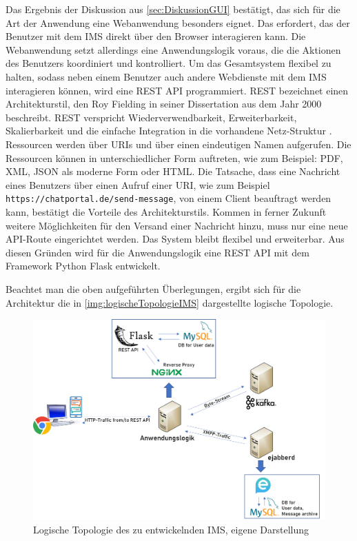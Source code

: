 \documentclass[a4paper,titlepage,halfparskip,12pt]{scrreprt}
\begin{document}
\begin{onehalfspacing}
Das Ergebnis der Diskussion aus \autoref{sec:DiskussionGUI} bestätigt, das sich für die Art der Anwendung eine Webanwendung besonders eignet. Das erfordert, das der Benutzer mit dem \ac{IMS} direkt über den Browser interagieren kann. Die Webanwendung setzt allerdings eine Anwendungslogik voraus, die die Aktionen des Benutzers koordiniert und kontrolliert. Um das Gesamtsystem flexibel zu halten, sodass neben einem Benutzer auch andere Webdienste mit dem \ac{IMS} interagieren können, wird eine \acs{REST} \acs{API} programmiert. \acs{REST} bezeichnet einen Architekturstil, den Roy Fielding in seiner Dissertation \cite{fieldingREST} aus dem Jahr 2000 beschreibt. \ac{REST} verspricht Wiederverwendbarkeit, Erweiterbarkeit, Skalierbarkeit und die einfache Integration in die vorhandene Netz-Struktur \cite{fieldingREST}. Ressourcen werden über \acs{URI}s und über einen eindeutigen Namen aufgerufen. Die Ressourcen können in unterschiedlicher Form auftreten, wie zum Beispiel: \acs{PDF}, \acs{XML}, \acs{JSON} als moderne Form oder \acs{HTML}. Die Tatsache, dass eine Nachricht eines Benutzers über einen Aufruf einer \acs{URI}, wie zum Beispiel \texttt{https://chatportal.de/send-message}, von einem Client beauftragt werden kann, bestätigt die Vorteile des Architekturstils. Kommen in ferner Zukunft weitere Möglichkeiten für den Versand einer Nachricht hinzu, muss nur eine neue \acs{API}-Route eingerichtet werden. Das System bleibt flexibel und erweiterbar. Aus diesen Gründen wird für die Anwendungslogik eine \acs{REST} \acs{API} mit dem Framework Python Flask entwickelt.

Beachtet man die oben aufgeführten Überlegungen, ergibt sich für die Architektur die in \autoref{img:logischeTopologieIMS} dargestellte logische Topologie.

\begin{figure}[h]
	\centering
	\includegraphics[width=\linewidth]{images/DetailliertesIMSArchitecture}
	\caption{Logische Topologie des zu entwickelnden \ac{IMS}, eigene Darstellung}
	\label{img:logischeTopologieIMS}
\end{figure}


\end{onehalfspacing}
\end{document}
